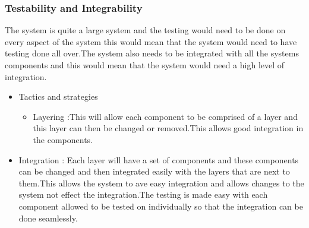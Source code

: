 \subsubsection{Testability and Integrability}
\begin{flushleft}
The system is quite a large system and the testing would need to be done on every aspect of the system this would mean that the system would need to have testing done all over.The system also needs to be integrated with all the systems components and this would mean that the system would need a high level of integration.
\begin{itemize}
\item{Tactics and strategies}
\begin{itemize}
\item{Layering} :This will allow each component to be comprised of a layer and this layer can then be changed or removed.This allows good integration in the components.

\end{itemize}

\item{Integration} :
Each layer will have a set of components and these components can be changed and then integrated easily with the layers that are next to them.This allows the system to ave easy integration and allows changes to the system not effect the integration.The testing is made easy with each component allowed to be tested on individually so that the integration can be done seamlessly.
\end{itemize}

\end{flushleft}
		
